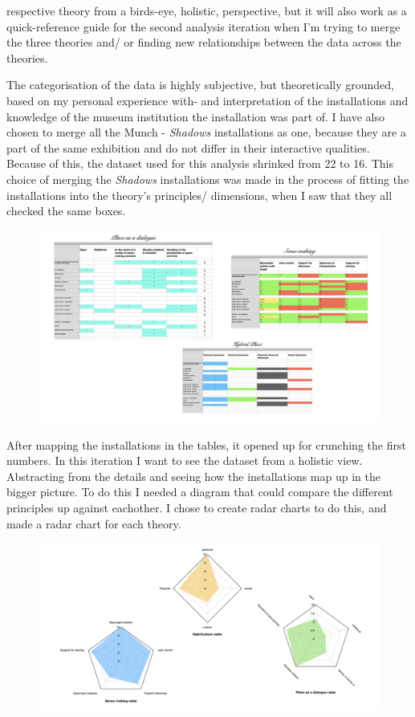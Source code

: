 respective theory from a birds-eye, holistic, perspective, but it will also work as a quick-reference guide for the second analysis iteration when I'm trying to merge the three theories and/ or finding new relationships between the data across the theories.

The categorisation of the data is highly subjective, but theoretically grounded, based on my personal experience with- and interpretation of the installations and knowledge of the museum institution the installation was part of. I have also chosen to merge all the Munch - \emph{Shadows} installations as one, because they are a part of the same exhibition and do not differ in their interactive qualities. Because of this, the dataset used for this analysis shrinked from 22 to 16. This choice of merging the \emph{Shadows} installations was made in the process of fitting the installations into the theory's principles/ dimensions, when I saw that they all checked the same boxes. 


\begin{figure}[H]
\includegraphics[width=13cm]{pictures/dataset/analysis_tables.png}
\centering 
\end{figure}

After mapping the installations in the tables, it opened up for crunching the first numbers. In this iteration I want to see the dataset from a holistic view. Abstracting from the details and seeing how the installations map up in the bigger picture. To do this I needed a diagram that could compare the different principles up against eachother. I chose to create radar charts to do this, and made a radar chart for each theory. 

\begin{figure}[H]
\includegraphics[width=13cm]{pictures/dataset/analysis_radars.png}
\centering 
\end{figure}

